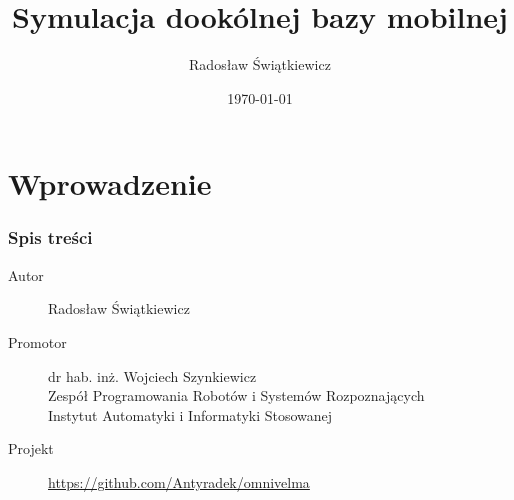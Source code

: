 \documentclass{beamer}
\begin{document}
	\section{Wprowadzenie}
	\begin{frame}
		\title[Omnivelma]{Symulacja dookólnej bazy mobilnej}
		\author{Radosław Świątkiewicz}
		\date{\today}
		\titlepage
	\end{frame}
	\begin{frame}
		\frametitle{Spis treści}
		\tableofcontents[currentsection]
	\end{frame}
	\begin{frame}
		\begin{description}
			\item[Autor] Radosław Świątkiewicz
			\item[Promotor] dr hab. inż. Wojciech Szynkiewicz \\ Zespół Programowania Robotów i Systemów Rozpoznających \\ Instytut Automatyki i Informatyki Stosowanej
			\item[Projekt] \url{https://github.com/Antyradek/omnivelma}
		\end{description}
	\end{frame}
	
\end{document}

